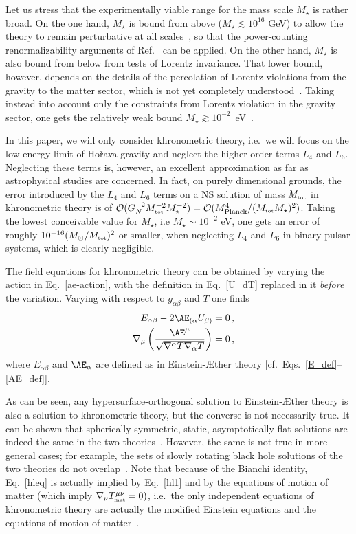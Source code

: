 \documentclass[prd,aps,twocolumn,nofootinbib,showpacs,superscriptaddress]{revtex4-1}
\newcommand\ba{\begin{eqnarray}}
\newcommand\ea{\end{eqnarray}}
\newcommand{\tot}{{\mbox{\tiny tot}}}
\newcommand{\MAT}{{\mbox{\tiny mat}}}
\begin{document}
Let us stress that the experimentally viable range for the mass scale $M_\star$ is rather broad. On the one hand, $M_\star$ is bound from above ($M_{\star}\lesssim 10^{16}$ GeV) to allow the theory to remain perturbative at all scales~\cite{Papazoglou:2009fj,Kimpton:2010xi,Blas:2009ck}, so that the power-counting renormalizability arguments of Ref.~\cite{Horava:2009uw} can be applied.
On the other hand, $M_\star$ is also bound from below from tests of Lorentz invariance. That lower bound, however, depends on the details
of the percolation of Lorentz violations from the gravity to the matter sector, which is not yet completely understood~\cite{Burgess:2002tb,Iengo:2009ix,Pospelov:2010mp,Blas:2010hb,Liberati:2012jf,Liberati:2013xla}. 
Taking instead into account only
the constraints from Lorentz violation in the gravity sector, one gets the relatively weak bound $M_\star\gtrsim 10^{-2}$~eV~\cite{will-living,Blas:2010hb}.

In this paper, we will only consider khronometric theory, i.e.~we will focus on
the low-energy limit of Ho\v rava gravity and neglect the higher-order terms $L_4$
and $L_6$. Neglecting
these terms is, however, an excellent approximation as far as astrophysical studies are concerned. In fact,
on purely dimensional grounds, the error introduced
by the $L_4$ and $L_6$ terms on a NS solution of mass $M_\tot$ in khronometric theory is of
${\cal{O}}(G_{N}^{-2} M_\tot^{-2} M_\star^{-2}) = {\cal{O}}(M_{\rm Planck}^4/(M_\tot M_{\star})^2)$. Taking the lowest conceivable value for $M_\star$, i.e $M_\star\sim 10^{-2}$ eV, one gets an error of roughly $10^{-16} (M_{\odot}/M_\tot)^2$ or smaller, when neglecting $L_{4}$ and $L_{6}$ in binary pulsar systems, which is clearly negligible. 

The field equations for khronometric theory can be obtained by varying the action in Eq.~\eqref{ae-action}, with the definition
in Eq.~\eqref{U_dT} replaced in it \textit{before} the variation. Varying with respect to
 $g_{\alpha\beta}$ and $T$ one finds 
\ba\label{hl1}
&&E_{\alpha\beta}-2\AE_{(\alpha}U_{\beta)}=0\,,\\
 \label{hleq}
&&\nabla_\mu \left(\frac{\AE^\mu}{\sqrt{\nabla^\alpha T \nabla_\alpha T}}  \right)=0\,,
\ea
where $E_{\alpha\beta}$ and $\AE_\alpha$ are defined as in Einstein-\AE ther theory [cf.~Eqs.~\eqref{E_def}--\eqref{AE_def}]. 

As can be seen, any hypersurface-orthogonal solution to Einstein-\AE ther theory
is also a solution to khronometric theory, but the converse is not necessarily true. It can be shown that spherically symmetric, static, asymptotically flat solutions are 
indeed the same in the two theories~\cite{Jacobson:2010mx,Blas:2011ni,Blas:2010hb,Barausse:2012ny}. However, the same is not true in more general cases; for example,
the sets of slowly rotating black hole solutions of the two theories do not overlap~\cite{Barausse:2012ny,Barausse:2012qh,Barausse:2013nwa}. Note that 
because of the Bianchi identity, Eq.~\eqref{hleq} is actually implied by Eq.~\eqref{hl1} and by the equations
of motion of matter (which imply $\nabla_\nu T^{\mu\nu}_{\MAT}=0)$, 
i.e.~the only independent equations of khronometric theory are actually the modified Einstein equations
and the equations of motion of matter~\cite{Jacobson:2010mx}.
\end{document}
